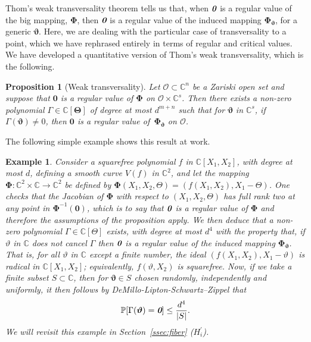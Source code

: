 \documentclass[a4paper]{article}
\def\bz{\textit{\textbf{0}}}
\def\Thetab{\bm{\Theta}}
\def\thetab{\bm{\vartheta}}
\def\vt{\vartheta}
\def\dt{s}
\def\C{\mathbb{C}}
\newtheorem{ex}[theorem]{Example}
\newtheorem{prop}[theorem]{Proposition}
\begin{document}
Thom’s weak transversality theorem tells us that, when $\bz$ is a regular value of the big mapping, $\bm \Phi$, then $\bz$ is a regular value of the induced mapping $\bm \Phi_{\bm \vt}$, for a generic $\bm \vt$. Here, we are dealing with the particular case of transversality to a point, which we have rephrased entirely in terms of regular and critical values. We have developed a quantitative version of Thom’s weak transversality, which is the following.

\begin{prop} [Weak transversality]\label{prop:weak_t}
Let $\mathscr{O} \subset \C^n$ be a Zariski open set and suppose that $\bm 0$ is a regular value of $\bm\Phi$ on $\mathscr{O} \times \C^{s}$. Then there
    exists a non-zero polynomial $\Gamma \in \C[\Thetab]$ of degree at
    most $d^{m+n}$ such that for $\thetab$ in $\C^\dt$, if
    $\Gamma(\thetab)\ne 0$, then $\bm 0$ is a regular value
    of~$\bm\Phi_{\thetab}$ on $\mathscr{O}$.
\end{prop}
\noindent 
The following simple example shows this result at work. 
%
\begin{ex}
Consider a
squarefree polynomial $f$ in $\C[X_1,X_2]$, with degree at most $d$, defining a smooth curve  $V(f)$ in
$\C^2$, and let the mapping $\bm\Phi:\C^2\times \C \to \C^2$ be
defined by $\bm\Phi(X_1,X_2,\Theta) = (f(X_1,X_2), X_1-\Theta)$. One
checks that the Jacobian of $\bm\Phi$ with respect to
$(X_1,X_2,\Theta)$ has full rank two at any point in $\bm\Phi^{-1}(\bm 0)$, which is to say that $\bz$ is a regular value of $\bm \Phi$ and therefore the assumptions of the proposition apply. We then deduce that a non-zero polynomial $\Gamma \in \C[\Theta]$ exists, with degree at most $d^{4}$ with the property that, if $\vartheta$ in $\C$ does not cancel $\Gamma$ then $\bz$ is a regular value of the induced mapping $\bm \Phi_{\bm \vt}$. That is, for all $\vartheta$ in $\C$
except a finite number, the ideal $(f(X_1,X_2), X_1-\vartheta)$ is
radical in $\C[X_1,X_2]$; equivalently, $f(\vartheta, X_2)$ is
squarefree. Now, if we take a finite subset $S \subset \C$, then for $\bm \vt \in S$ chosen randomly, independently and uniformly, it then follows by DeMillo-Lipton-Schwartz–Zippel that 
\[
\mathbb{P}[\Gamma(\bm \vt) = \bz] \leq \frac{d^4}{|S|}.
\]
We will revisit this example in Section~\ref{ssec:fiber} ($H_i^{'}$).
\end{ex}
%


\end{document}
